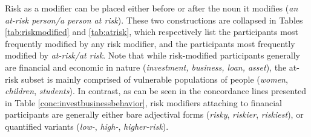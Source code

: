     Risk as a modifier can be placed either before or after the noun it modifies (\emph{an at-risk person\slash a person at risk}). These two constructions are collapsed in Tables \ref{tab:riskmodified} and \ref{tab:atrisk}, which respectively list the participants most frequently modified by any risk modifier, and the participants most frequently modified by \emph{at-risk\slash at risk}. Note that while risk-modified participants generally are financial and economic in nature (\emph{investment, business, loan, asset}), the at-risk subset is mainly comprised of vulnerable populations of people (\emph{women}, \emph{children}, \emph{students}). In contrast, as can be seen in the concordance lines presented in Table \ref{conc:investbusinessbehavior}, risk modifiers attaching to financial participants are generally either bare adjectival forms (\emph{risky}, \emph{riskier}, \emph{riskiest}), or quantified variants (\emph{low-}, \emph{high-}, \emph{higher-risk}).

